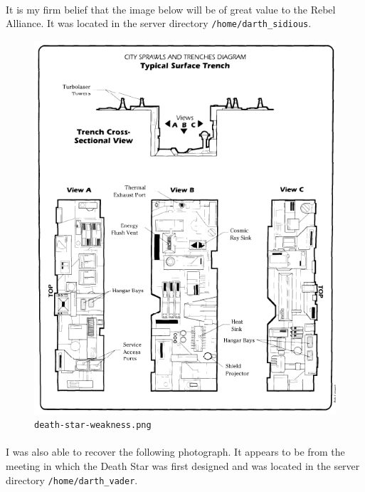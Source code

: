 \documentclass{article}
\begin{document}
\paragraph{}
It is my firm belief that the image below will be of great value to the Rebel Alliance. It was located in the server directory \texttt{/home/darth\_sidious}.

\begin{figure}[H]
	\includegraphics[width=\linewidth]{resources/plans/death-star-weakness.png}
	\caption{\texttt{death-star-weakness.png}}
	\label{fig:death_star_weakness}
\end{figure}

\paragraph{}
I was also able to recover the following photograph. It appears to be from the meeting in which the Death Star was first designed and was located in the server directory \texttt{/home/darth\_vader}.
\end{document}
